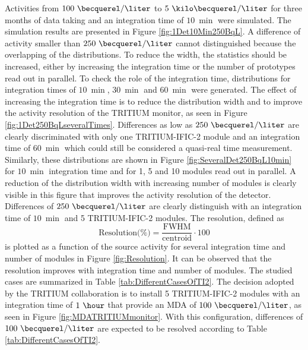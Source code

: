 Activities from $100~\becquerel/\liter$ to $5~\kilo\becquerel/\liter$ for three months of data taking and an integration time of $10~\min$ were simulated. The simulation results are presented in Figure \ref{fig:1Det10Min250BqL}. A difference of activity smaller than $250~\becquerel/\liter$ cannot distinguished because the overlapping of the distributions. To reduce the width, the statistics should be increased, either by increasing the integration time or the number of prototypes read out in parallel. To check the role of the integration time, distributions for integration times of $10~\min$, $30~\min$ and $60~\min$ were generated. The effect of increasing the integration time is to reduce the distribution width and to improve the activity resolution of the TRITIUM monitor, as seen in Figure \ref{fig:1Det250BqLseveralTimes}. Differences as low as $250~\becquerel/\liter$ are clearly discriminated with only one TRITIUM-IFIC-2 module and an integration time of $60~\min$ which could still be considered a quasi-real time measurement. Similarly, these distributions are shown in Figure \ref{fig:SeveralDet250BqL10min} for $10~\min$ integration time and for 1, 5 and 10 modules read out in parallel. A reduction of the distribution width with increasing number of modules is clearly visible in this figure that improves the activity resolution of the detector. Differences of $250~\becquerel/\liter$ are clearly distinguish with an integration time of $10~\min$ and 5 TRITIUM-IFIC-2 modules. The resolution, defined as
\begin{equation}
\text{Resolution(\%)}=\frac{\text{FWHM}}{\text{centroid}}\cdot{}100
\label{eq:Resolution}
\end{equation}
is plotted as a function of the source activity for several integration time and number of modules in Figure \ref{fig:Resolution}. It can be observed that the resolution improves with integration time and number of modules. The studied cases are summarized in Table \ref{tab:DifferentCasesOfTI2}. The decision adopted by the TRITIUM collaboration is to install 5 TRITIUM-IFIC-2 modules with an integration time of $1~\hour$ that provide an MDA of $100~\becquerel/\liter$, as seen in Figure \ref{fig:MDATRITIUMmonitor}. With this configuration, differences of $100~\becquerel/\liter$ are expected to be resolved according to Table \ref{tab:DifferentCasesOfTI2}. 

